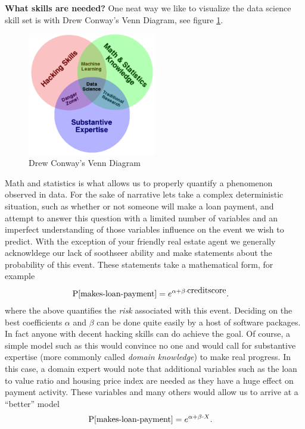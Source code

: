 \textbf{What skills are needed?}
One neat way we like to visualize the data science skill set is with Drew Conway's Venn Diagram\cite{ConwayVenn}, see figure \ref{figure:conwayvenn}.
\begin{figure}
  \includegraphics[width=0.5\textwidth]{../images/Data_Science_VD}
  \caption{Drew Conway's Venn Diagram}
  \label{figure:conwayvenn}
\end{figure}
Math and statistics is what allows us to properly quantify a phenomenon observed in data. For the sake of narrative lets take a complex deterministic situation, such as whether or not someone will make a loan payment, 
and attempt to answer this question with a limited number of variables and an imperfect understanding of those variables influence on the event we wish to predict. 
With the exception of your friendly real estate agent we generally acknowldege our lack of soothseer ability and make statements about the probability of this event.  These statements take a mathematical form, for example
\begin{align*}
  \mathrm{P}[\mbox{makes-loan-payment}] &= e^{\alpha + \beta\cdot\mbox{creditscore}}.
\end{align*}
where the above quantifies the \emph{risk} associated with this event.  Deciding on the best coefficients $\alpha$ and $\beta$ can be done quite easily by a host of software packages.  In fact anyone with decent hacking
skills can do achieve the goal.  Of course, a simple model such as this would convince no one and would call for substantive expertise (more commonly called \emph{domain knowledge}) to make real progress.  In this case, 
a domain expert would note that additional variables such as the loan to value ratio and housing price index are needed as they have a huge effect on payment activity. These variables and many others 
would allow us to arrive at a  ``better'' model
\begin{align}
  \mathrm{P}[\mbox{makes-loan-payment}] &= e^{\alpha + \beta\cdot X}.
  \label{align:preface:logit}
\end{align}
